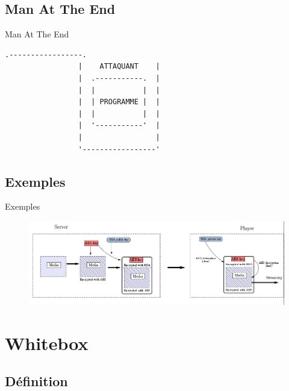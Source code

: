 \documentclass{beamer}
\begin{document}
\subsection{Man At The End}

\begin{frame}[fragile]{Man At The End}

\begin{Verbatim}[samepage=true]
                 .-----------------. 
                 |    ATTAQUANT    |
                 |  .-----------.  |  
                 |  |           |  |  
                 |  | PROGRAMME |  | 
                 |  |           |  | 
                 |  '-----------'  |
                 |                 |
                 '-----------------'
\end{Verbatim}
  
\end{frame}

\subsection{Exemples}

\begin{frame}{Exemples}

 \begin{figure}[h]
    \centering
    \includegraphics[scale=0.50]{./images/drms.png}
  \end{figure}

\end{frame}

\section{Whitebox}

\subsection{Définition}
\end{document}
